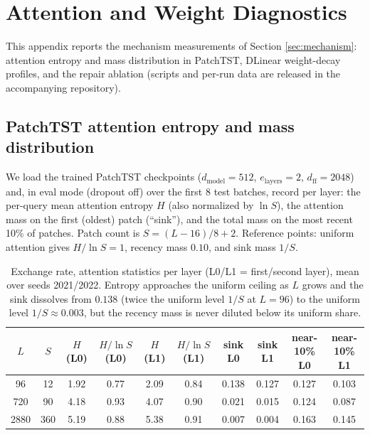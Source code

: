 \section{Attention and Weight Diagnostics}
\label{app:attn}

This appendix reports the mechanism measurements of Section \ref{sec:mechanism}: attention entropy and mass distribution in PatchTST, DLinear weight-decay profiles, and the repair ablation (scripts and per-run data are released in the accompanying repository).

\subsection{PatchTST attention entropy and mass distribution}

We load the trained PatchTST checkpoints ($d_{\mathrm{model}}{=}512$, $e_{\mathrm{layers}}{=}2$, $d_{\mathrm{ff}}{=}2048$) and, in eval mode (dropout off) over the first 8 test batches, record per layer: the per-query mean attention entropy $H$ (also normalized by $\ln S$), the attention mass on the first (oldest) patch (``sink''), and the total mass on the most recent 10\% of patches. Patch count is $S = (L-16)/8 + 2$. Reference points: uniform attention gives $H/\ln S = 1$, recency mass $0.10$, and sink mass $1/S$.

\begin{table}[t]
\caption{Exchange rate, attention statistics per layer (L0/L1 = first/second layer), mean over seeds 2021/2022. Entropy approaches the uniform ceiling as $L$ grows and the sink dissolves from $0.138$ (twice the uniform level $1/S$ at $L{=}96$) to the uniform level $1/S \approx 0.003$, but the recency mass is never diluted below its uniform share.}
\label{tab:attn_exchange}
\centering\small
\begin{tabular}{cc cccc cc cc}
\toprule
$L$ & $S$ & $H$(L0) & $H/\ln S$(L0) & $H$(L1) & $H/\ln S$(L1) & sink L0 & sink L1 & near-10\% L0 & near-10\% L1 \\
\midrule
96 & 12 & 1.92 & 0.77 & 2.09 & 0.84 & 0.138 & 0.127 & 0.127 & 0.103 \\
720 & 90 & 4.18 & 0.93 & 4.07 & 0.90 & 0.021 & 0.015 & 0.124 & 0.087 \\
2880 & 360 & 5.19 & 0.88 & 5.38 & 0.91 & 0.007 & 0.004 & 0.163 & 0.145 \\
\bottomrule
\end{tabular}
\end{table}

